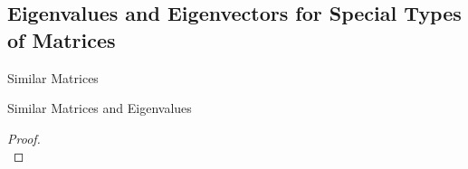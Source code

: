 \subsection{Eigenvalues and Eigenvectors for Special Types of Matrices}

%
%
\begin{definition}{Similar Matrices}\label{def:similarmatrices}
\begin{equation*}
\end{equation*}
\end{definition}
%
%
\begin{lemma}{Similar Matrices and Eigenvalues}\label{lem:similarmatrices}
\end{lemma}
%
\begin{proof}
%
\begin{equation*}
\end{equation*}
\begin{equation*}
\end{equation*}
%
%
\end{proof}
